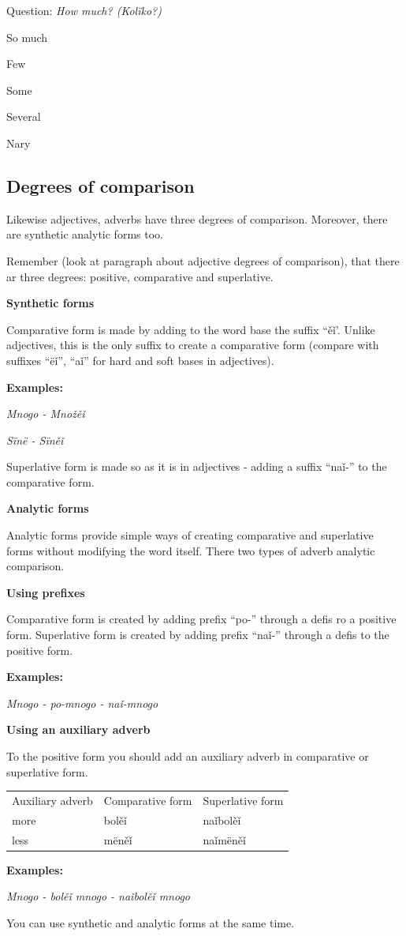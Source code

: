 Question: \textit{How much? (Kolïko?)}

So much

Few

Some

Several

Nary

\subsection{Degrees of comparison}

Likewise adjectives, adverbs have three degrees of comparison. Moreover, there are synthetic analytic forms too. 

Remember (look at paragraph about adjective degrees of comparison), that there ar three degrees: positive, comparative and superlative.

\textbf{Synthetic forms}

Comparative form is made by adding to the word base the suffix “ěǐ’. Unlike adjectives, this is the only suffix to create a comparative form (compare with suffixes “ëǐ”, “aǐ” for hard and soft bases in adjectives). 

\textbf{Examples:}

\textit{Mnogo - Množěǐ}

\textit{Sïnë - Sïněǐ}

Superlative form is made so as it is in adjectives - adding a suffix “naǐ-” to the comparative form.

\textbf{Analytic forms}

Analytic forms provide simple ways of creating comparative and superlative forms without modifying the word itself. There two types of adverb analytic comparison.

\textbf{Using prefixes}

Comparative form is created by adding prefix “po-” through a defis ro a positive form. Superlative form is created by adding prefix “naǐ-” through a defis to the positive form.

\textbf{Examples:}

\textit{Mnogo - po-mnogo - naǐ-mnogo}

\textbf{Using an auxiliary adverb}

To the positive form you should add an auxiliary adverb in comparative or superlative form.

\begin{table}
	\begin{tabular}{lll}
		Auxiliary adverb
		& Comparative form
		& Superlative form \\
		more & bolěǐ & naǐbolěǐ \\
		less & mëněǐ & naǐmëněǐ \\
	\end{tabular}
\end{table}

\textbf{Examples:}

\textit{Mnogo - bolěǐ mnogo - naǐbolěǐ mnogo}

You can use synthetic and analytic forms at the same time.
